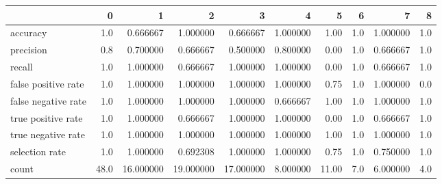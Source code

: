 \begin{tabular}{lrrrrrrrrr}
\toprule
{} &     0 &          1 &          2 &          3 &         4 &      5 &    6 &         7 &    8 \\
\midrule
accuracy            &   1.0 &   0.666667 &   1.000000 &   0.666667 &  1.000000 &   1.00 &  1.0 &  1.000000 &  1.0 \\
precision           &   0.8 &   0.700000 &   0.666667 &   0.500000 &  0.800000 &   0.00 &  1.0 &  0.666667 &  1.0 \\
recall              &   1.0 &   1.000000 &   0.666667 &   1.000000 &  1.000000 &   0.00 &  1.0 &  0.666667 &  1.0 \\
false positive rate &   1.0 &   1.000000 &   1.000000 &   1.000000 &  1.000000 &   0.75 &  1.0 &  1.000000 &  0.0 \\
false negative rate &   1.0 &   1.000000 &   1.000000 &   1.000000 &  0.666667 &   1.00 &  1.0 &  1.000000 &  1.0 \\
true positive rate  &   1.0 &   1.000000 &   0.666667 &   1.000000 &  1.000000 &   0.00 &  1.0 &  0.666667 &  1.0 \\
true negative rate  &   1.0 &   1.000000 &   1.000000 &   1.000000 &  1.000000 &   1.00 &  1.0 &  1.000000 &  1.0 \\
selection rate      &   1.0 &   1.000000 &   0.692308 &   1.000000 &  1.000000 &   0.75 &  1.0 &  0.750000 &  1.0 \\
count               &  48.0 &  16.000000 &  19.000000 &  17.000000 &  8.000000 &  11.00 &  7.0 &  6.000000 &  4.0 \\
\bottomrule
\end{tabular}
